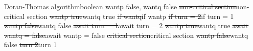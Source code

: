 \begin{wideslide}[bm=,toc=]{\large }
\begin{alg}{Doran-Thomas algorithm}{boolean wantp \la{} false, wantq \la{} false}
\hline
{}
\st{\idt{}non-critical section}{\idt{}non-critical section}
\st{\idt{}wantp \la{} true}{\idt{}wantq \la{} true}
\st{\idt{}if wantq}{\idt{}if wantp}
\st{\idt{}\idt{}if turn = 2}{\idt{}\idt{}if turn = 1}
\st{\idt{}\idt{}\idt{}wantp \la{} false}{\idt{}\idt{}\idt{}wantq \la{} false}
\st{\idt{}\idt{}\idt{}await turn = 1}{\idt{}\idt{}\idt{}await turn = 2}
\st{\idt{}\idt{}\idt{}wantp \la{} true}{\idt{}\idt{}\idt{}wantq \la{} true}
\st{\idt{}\idt{}await wantq = false}{\idt{}\idt{}await wantp = false}
\st{\idt{}critical section}{\idt{}critical section}
\st{\idt{}wantp \la{} false}{\idt{}wantq \la{} false}
\st{\idt{}turn \la{} 2}{\idt{}turn \la{} 1}
\end{alg}
\end{wideslide}

